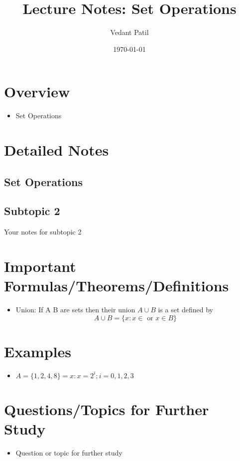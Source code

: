 \documentclass[12pt,a4paper]{article}
\title{Lecture Notes: Set Operations}
\author{Vedant Patil}
\date{\today}
\begin{document}
\maketitle

\section{Overview}
\begin{tcolorbox}[colback=yellow!10!white,colframe=yellow!50!black,title=Key Points]
  \begin{itemize}
    \item Set Operations 
  \end{itemize}
\end{tcolorbox}

\section{Detailed Notes}
\subsection{Set Operations}


\subsection{Subtopic 2}
Your notes for subtopic 2

\section{Important Formulas/Theorems/Definitions}
\begin{tcolorbox}[colback=blue!5!white,colframe=blue!75!black,title=Key Formula/Theorem]
  \begin{itemize}
    \item  Union: If A B are sets then their union \( A \cup B \) is a set defined by 
  \begin{equation}
     A \cup B = \{x: x \in \text{ or } x \in B \}   
  \end{equation}
  \end{itemize}
\end{tcolorbox}

\section{Examples}
\begin{tcolorbox}
  \begin{itemize}
    \item \( A = \{1,2,4,8\} = {x:x=2^i; i=0, 1, 2, 3}  \)
  \end{itemize}
\end{tcolorbox}

\section{Questions/Topics for Further Study}
\begin{itemize}
  \item Question or topic for further study
\end{itemize}
\end{document}
